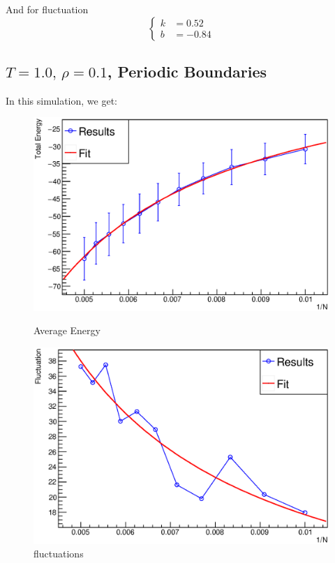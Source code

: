 \documentclass[UTF8,a4paper]{article}
\begin{document}
And for fluctuation
\begin{equation}
	\left\{
		\begin{aligned}
			k &= 0.52\\
			b &= -0.84
		\end{aligned}
	\right.
\end{equation}


\subsection{$T =1.0,\, \rho = 0.1$, Periodic Boundaries}
In this simulation, we get:
\begin{figure}[H]
	\centering
	\begin{minipage}[t]{0.45\textwidth}
		\centering
		\includegraphics[height=0.2\textheight]{Root Fit/fit_exp2.eps}
		\caption{Average Energy}
	\end{minipage}\hspace{0.5cm}
	\begin{minipage}[t]{0.45\textwidth}
		\centering
		\includegraphics[height=0.2\textheight]{Root Fit/fit_exp2_f.eps}
		\caption{fluctuations}
	\end{minipage}
\end{figure}
\end{document}
